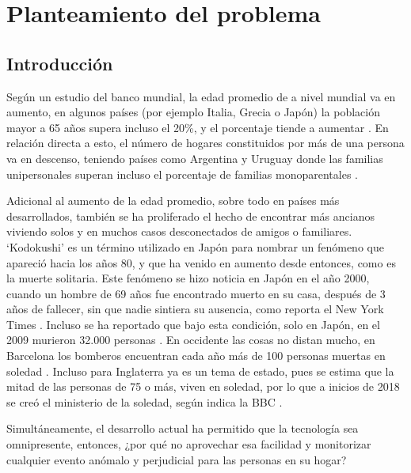 \chapter{Planteamiento del problema}
\label{chap:ProblemStatement}

\section{Introducción}
\label{Introduction}


    Según un estudio del banco mundial, la edad promedio de a nivel mundial va en aumento, en algunos países (por ejemplo Italia, Grecia o Japón) la población mayor a 65 años supera incluso el 20\%, y el porcentaje tiende a aumentar \cite{WorldBank2019}. En relación directa a esto, el número de hogares constituidos por más de una persona va en descenso, teniendo países como Argentina y Uruguay donde las familias unipersonales superan incluso el porcentaje de familias monoparentales \cite{Arriagada2007}.
    
    Adicional al aumento de la edad promedio, sobre todo en países más desarrollados, también se ha proliferado el hecho de encontrar más ancianos viviendo solos y en muchos casos desconectados de amigos o familiares. ‘Kodokushi’ es un término utilizado en Japón para nombrar un fenómeno que apareció hacia los años 80, y que ha venido en aumento desde entonces, como es la muerte solitaria. Este fenómeno se hizo noticia en Japón en el año 2000, cuando un hombre de 69 años fue encontrado muerto en su casa, después de 3 años de fallecer, sin que nadie sintiera su ausencia, como reporta el New York Times \cite{Onishi2017}. Incluso se ha reportado que bajo esta condición, solo en Japón, en el 2009 murieron 32.000 personas \cite{Allison2014}. En occidente las cosas no distan mucho, en Barcelona los bomberos encuentran cada año más de 100 personas muertas en soledad \cite{Sanchez2016}. Incluso para Inglaterra ya es un tema de estado, pues se estima que la mitad de las personas de 75 o más, viven en soledad, por lo que a inicios de 2018 se creó el ministerio de la soledad, según indica la BBC \cite{BBC2018}.
    
    Simultáneamente, el desarrollo actual ha permitido que la tecnología sea omnipresente, entonces, ¿por qué no aprovechar esa facilidad y monitorizar cualquier evento anómalo y perjudicial para las personas en su hogar? 
    
